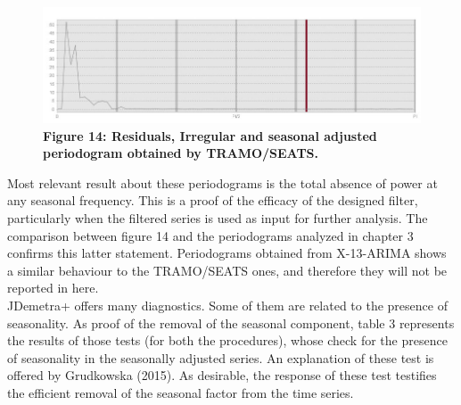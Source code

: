 \documentclass{article}
\begin{document}
\begin{figure}[H]
  \includegraphics[width=\textwidth]{../images/capitolo4/TSsaper.jpg}
  {\textbf{\scriptsize Figure 14: Residuals, Irregular and seasonal adjusted periodogram obtained by TRAMO/SEATS.}}
\end{figure}
Most relevant result about these periodograms is the total absence of power at any seasonal frequency. This is a proof of the efficacy of the designed filter, particularly when the filtered series is used as input for further analysis. The comparison between figure 14 and the periodograms analyzed in chapter 3 confirms this latter statement. Periodograms obtained from X-13-ARIMA shows a similar behaviour to the TRAMO/SEATS ones, and therefore they will not be reported in here.\\JDemetra+ offers many diagnostics. Some of them are related to the presence of seasonality. As proof of the removal of the seasonal component, table 3 represents the results of those tests (for both the procedures), whose check for the presence of seasonality in the seasonally adjusted series. An explanation of these test is offered by Grudkowska (2015). As desirable, the response of these test testifies the efficient removal of the seasonal factor from the time series.
\end{document}
